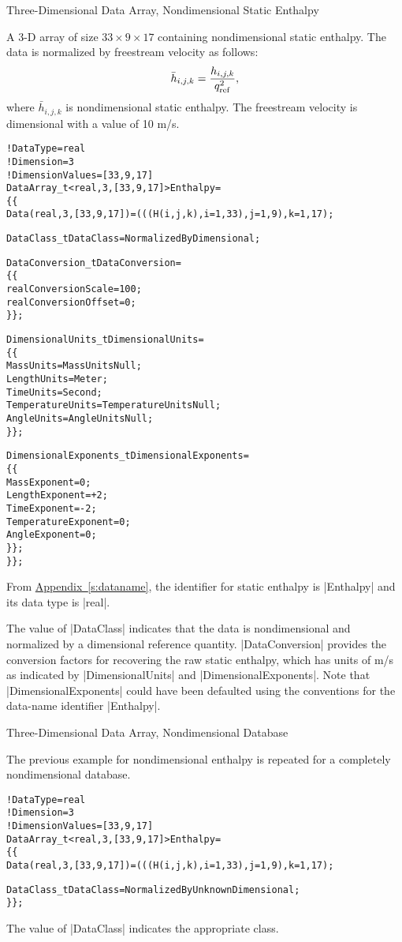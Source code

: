 \begin{example}{Three-Dimensional Data Array, Nondimensional Static Enthalpy}
\label{ex:data3}

A 3-D array of size $33\times 9\times 17$ containing nondimensional static 
enthalpy.  The data is normalized by freestream velocity as follows:
$$
 \bar{h}_{i,j,k} = {h_{i,j,k} \over q^2_{\rm ref}},
$$
where $\bar{h}_{i,j,k}$ is nondimensional static enthalpy.  The freestream
velocity is dimensional with a value of 10 m/s.  
\begin{alltt}
  !  DataType = real
  !  Dimension = 3
  !  DimensionValues = [33,9,17]
  DataArray\_t<real, 3, [33,9,17]> Enthalpy =
    \{\{
    Data(real, 3, [33,9,17]) = (((H(i,j,k), i=1,33), j=1,9), k=1,17) ;
    
    DataClass\_t DataClass = NormalizedByDimensional ;
    
    DataConversion\_t DataConversion =
      \{\{
      real ConversionScale  = 100 ;
      real ConversionOffset = 0 ;
      \}\} ;
      
    DimensionalUnits\_t DimensionalUnits =
      \{\{
      MassUnits        = MassUnitsNull ;
      LengthUnits      = Meter ;
      TimeUnits        = Second ;
      TemperatureUnits = TemperatureUnitsNull ;
      AngleUnits       = AngleUnitsNull ;
      \}\} ;
	
    DimensionalExponents\_t DimensionalExponents =
      \{\{
      MassExponent        =  0 ;
      LengthExponent      = +2 ;
      TimeExponent        = -2 ;
      TemperatureExponent =  0 ;
      AngleExponent       =  0 ;
      \}\} ;
    \}\} ;
\end{alltt}
From \hyperref[s:dataname]{Appendix~\ref*{s:dataname}}, the identifier for
static enthalpy is |Enthalpy| and its data type is |real|.

The value of |DataClass| indicates that the data is nondimensional and
normalized by a dimensional reference quantity.  |DataConversion| provides
the conversion factors for recovering the raw static enthalpy, which has
units of m/s as indicated by |DimensionalUnits| and
|DimensionalExponents|.  Note that |DimensionalExponents| could have been
defaulted using the conventions for the data-name identifier |Enthalpy|.
\end{example}

\begin{example}{Three-Dimensional Data Array, Nondimensional Database}
\label{ex:data4}

The previous example for nondimensional enthalpy is repeated for a
completely nondimensional database.
\begin{alltt}
  !  DataType = real
  !  Dimension = 3
  !  DimensionValues = [33,9,17]
  DataArray\_t<real, 3, [33,9,17]> Enthalpy =
    \{\{
    Data(real, 3, [33,9,17]) = (((H(i,j,k), i=1,33), j=1,9), k=1,17) ;
    
    DataClass\_t DataClass = NormalizedByUnknownDimensional ;
    \}\} ;
\end{alltt}
The value of |DataClass| indicates the appropriate class.  
\end{example}

